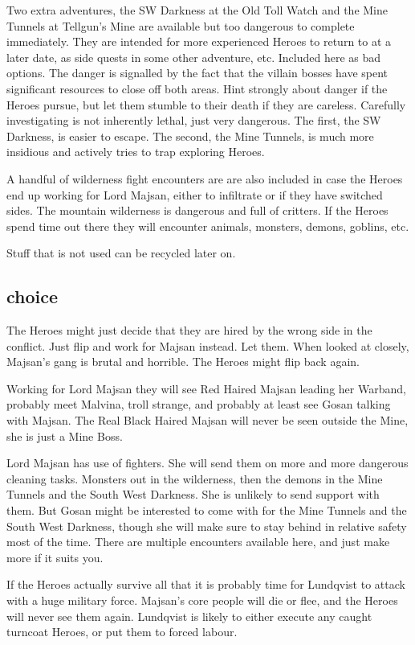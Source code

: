 Two extra adventures, the SW Darkness at the Old Toll Watch and the Mine Tunnels at Tellgun's Mine are available but too dangerous to complete immediately. They are intended for more experienced Heroes to return to at a later date, as side quests in some other adventure, etc.
Included here as bad options. The danger is signalled by the fact that the villain bosses have spent significant resources to close off both areas. Hint strongly about danger if the Heroes pursue, but let them stumble to their death if they are careless. Carefully investigating is not inherently lethal, just very dangerous. The first, the SW Darkness, is easier to escape. The second, the Mine Tunnels, is much more insidious and actively tries to trap exploring Heroes.

A handful of wilderness fight encounters are are also included in case the Heroes end up working for Lord Majsan, either to infiltrate or if they have switched sides. The mountain wilderness is dangerous and full of critters. If the Heroes spend time out there they will encounter animals, monsters, demons, goblins, etc.

Stuff that is not used can be recycled later on.




\subsection*{choice}
The Heroes might just decide that they are hired by the wrong side in the conflict. Just flip and work for Majsan instead. Let them. When looked at closely, Majsan's gang is brutal and horrible. The Heroes might flip back again.

Working for Lord Majsan they will see Red Haired Majsan leading her Warband, probably meet Malvina, troll strange, and probably at least see Gosan talking with Majsan. The Real Black Haired Majsan will never be seen outside the Mine, she is just a Mine Boss.

Lord Majsan has use of fighters. She will send them on more and more dangerous cleaning tasks. Monsters out in the wilderness, then the demons in the Mine Tunnels and the South West Darkness. She is unlikely to send support with them. But Gosan might be interested to come with for the Mine Tunnels and the South West Darkness, though she will make sure to stay behind in relative safety most of the time.
There are multiple encounters available here, and just make more if it suits you.

If the Heroes actually survive all that it is probably time for Lundqvist to attack with a huge military force. Majsan's core people will die or flee, and the Heroes will never see them again. Lundqvist is likely to either execute any caught turncoat Heroes, or put them to forced labour.






